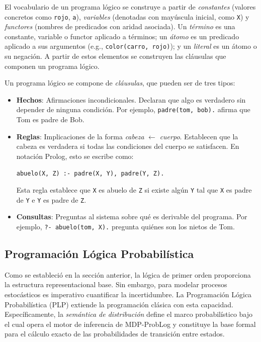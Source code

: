 El vocabulario de un programa lógico se construye a partir de \textit{constantes} (valores concretos como \texttt{rojo}, \texttt{a}), \textit{variables} (denotadas con mayúscula inicial, como \texttt{X}) y \textit{functores} (nombres de predicados con aridad asociada). Un \textit{término} es una constante, variable o functor aplicado a términos; un \textit{átomo} es un predicado aplicado a sus argumentos (e.g., \texttt{color(carro, rojo)}); y un \textit{literal} es un átomo o su negación. A partir de estos elementos se construyen las cláusulas que componen un programa lógico.

Un programa lógico se compone de \textit{cláusulas}, que pueden ser de tres tipos:

\begin{itemize}
    \item \textbf{Hechos}: Afirmaciones incondicionales. Declaran que algo es verdadero sin depender de ninguna condición. Por ejemplo, \texttt{padre(tom, bob).} afirma que Tom es padre de Bob.
    
    \item \textbf{Reglas}: Implicaciones de la forma \textit{cabeza} $\leftarrow$ \textit{cuerpo}. Establecen que la cabeza es verdadera si todas las condiciones del cuerpo se satisfacen. En notación Prolog, esto se escribe como:
    \begin{lstlisting}
abuelo(X, Z) :- padre(X, Y), padre(Y, Z).
    \end{lstlisting}
    Esta regla establece que \texttt{X} es abuelo de \texttt{Z} si existe algún \texttt{Y} tal que \texttt{X} es padre de \texttt{Y} e \texttt{Y} es padre de \texttt{Z}.
    
    \item \textbf{Consultas}: Preguntas al sistema sobre qué es derivable del programa. Por ejemplo, \texttt{?- abuelo(tom, X).} pregunta quiénes son los nietos de Tom.
\end{itemize}

\subsection{Programación Lógica Probabilística}
\label{sec:mt-plp}

Como se estableció en la sección anterior, la lógica de primer orden proporciona la estructura representacional base. Sin embargo, para modelar procesos estocásticos es imperativo cuantificar la incertidumbre. La Programación Lógica Probabilística (PLP) extiende la programación clásica con esta capacidad. Específicamente, la \textit{semántica de distribución} define el marco probabilístico bajo el cual opera el motor de inferencia de MDP-ProbLog y constituye la base formal para el cálculo exacto de las probabilidades de transición entre estados.

